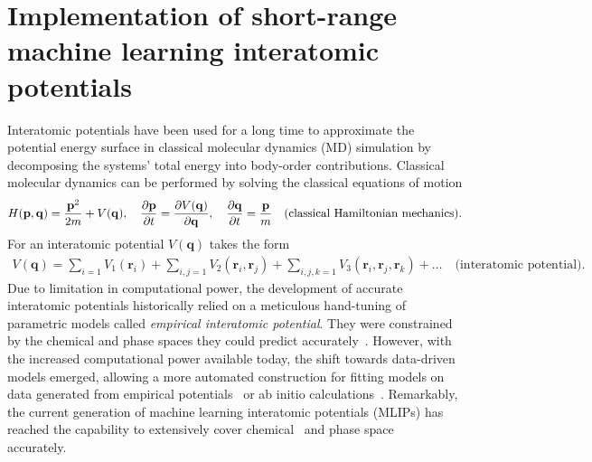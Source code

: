 \chapter{Implementation of short-range machine learning interatomic potentials}
\label{sec:mlip}

Interatomic potentials have been used for a long time to approximate the potential energy surface in classical molecular dynamics (MD) simulation by decomposing the systems' total energy into body-order contributions.
Classical molecular dynamics can be performed by solving the classical equations of motion
\begin{subequations}
\begin{align}
  H(\mathbf{p}, \mathbf{q}) = \frac{\mathbf{p}^2}{2m} + V(\mathbf{q}),\quad
  \frac{\partial\mathbf{p}}{\partial t} = \frac{\partial V(\mathbf{q})}{\partial\mathbf{q}},\quad\frac{\partial\mathbf{q}}{\partial t} = \frac{\mathbf{p}}{m}\quad\textrm{(classical Hamiltonian mechanics)}.
\end{align}\\
\end{subequations}
For an interatomic potential $V(\mathbf{q})$ takes the form
\begin{subequations}
\begin{gather}
  V(\mathbf{q}) = \sum_{i = 1} V_1(\mathbf{r}_i) + \sum_{i,j = 1} V_2(\mathbf{r}_i, \mathbf{r}_j) + \sum_{i,j,k = 1} V_3(\mathbf{r}_i, \mathbf{r}_j, \mathbf{r}_k) + \ldots \quad\textrm{(interatomic potential)}.
\end{gather}
\end{subequations}
Due to limitation in computational power, the development of accurate interatomic potentials historically relied on a meticulous hand-tuning of parametric models called \emph{empirical interatomic potential}.
They were constrained by the chemical and phase spaces they could predict accurately~\cite{stillinger1985computer, tersoff1988empirical}.
However, with the increased computational power available today, the shift towards data-driven models emerged, allowing a more automated construction for fitting models on data generated from empirical potentials~\cite{blank1995neural} or ab initio calculations~\cite{brown2003classical,lorenz2006descriptions,behl-parr07prl}.
Remarkably, the current generation of machine learning interatomic potentials (MLIPs) has reached the capability to extensively cover chemical~\cite{lopanitsyna2023modeling} and phase space~\cite{bartok2018machine} accurately.

